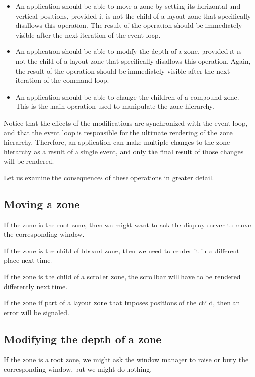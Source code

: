 \documentclass{report}
\begin{document}
\begin{itemize}
\item An application should be able to move a zone by setting its
  horizontal and vertical positions, provided it is not the child of a
  layout zone that specifically disallows this operation.  The result
  of the operation should be immediately visible after the next
  iteration of the event loop.
\item An application should be able to modify the depth of a zone,
  provided it is not the child of a layout zone that specifically
  disallows this operation.  Again, the result of the operation should
  be immediately visible after the next iteration of the command
  loop. 
\item An application should be able to change the children of a
  compound zone.  This is the main operation used to manipulate the
  zone hierarchy.  
\end{itemize}

Notice that the effects of the modifications are synchronized with the
event loop, and that the event loop is responsible for the ultimate
rendering of the zone hierarchy.  Therefore, an application can make
multiple changes to the zone hierarchy as a result of a single event,
and only the final result of those changes will be rendered.  

Let us examine the consequences of these operations in greater
detail. 

\subsection{Moving a zone}

If the zone is the root zone, then we might want to ask the display
server to move the corresponding window. 

If the zone is the child of bboard zone, then we need to render it in
a different place next time. 

If the zone is the child of a scroller zone, the scrollbar will have
to be rendered differently next time. 

If the zone if part of a layout zone that imposes positions of the
child, then an error will be signaled. 

\subsection{Modifying the depth of a zone}

If the zone is a root zone, we might ask the window manager to raise
or bury the corresponding window, but we might do nothing. 
\end{document}
